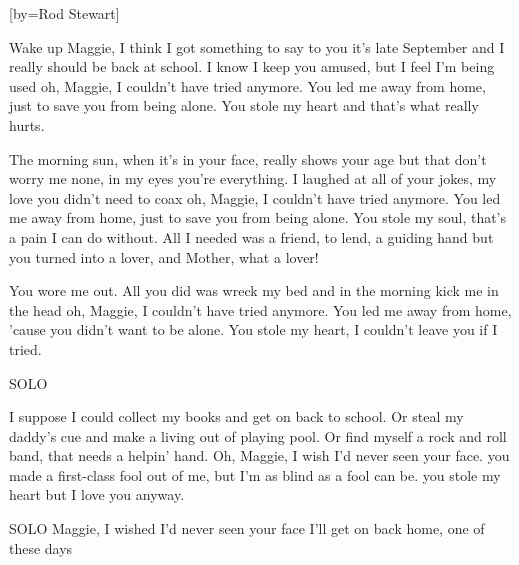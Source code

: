

[by=Rod Stewart]

\begin{LARGE}

\chordsoff
\beginverse
Wake up Maggie, I think I got something to say to you
it's late September and I really should be back at school.
I know I keep you amused, but I feel I'm being used
oh, Maggie, I couldn't have tried anymore.
You led me away from home, just to save you from being alone.
You stole my heart and that's what really hurts.
\endverse

\beginverse
The morning sun, when it's in your face, really shows your age
but that don't worry me none, in my eyes you're everything.
I laughed at all of your jokes, my love you didn't need to coax
oh, Maggie, I couldn't have tried anymore.
You led me away from home, just to save you from being alone.
You stole my soul, that's a pain I can do without.
All I needed was a friend, to lend, a guiding hand
but you turned into a lover, and Mother, what a lover!
\endverse

\beginverse
You wore me out. All you did was wreck my bed
and in the morning kick me in the head
oh, Maggie, I couldn't have tried anymore.
You led me away from home, 'cause you didn't want to be alone.
You stole my heart, I couldn't leave you if I tried.
\endverse

\beginverse
SOLO
\endverse

\beginverse
I suppose I could collect my books and get on back to school.
Or steal my daddy's cue and make a living out of playing pool.
Or find myself a rock and roll band, that needs a helpin' hand.
Oh, Maggie, I wish I'd never seen your face.
you made a first-class fool out of me, but I'm as blind as a fool can be.
you stole my heart but I love you anyway.
\endverse

\beginverse
SOLO
\endverse
\beginverse
Maggie, I wished I'd never seen your face
I'll get on back home, one of these days
\endverse



\end{LARGE}


\chordson
\endsong
